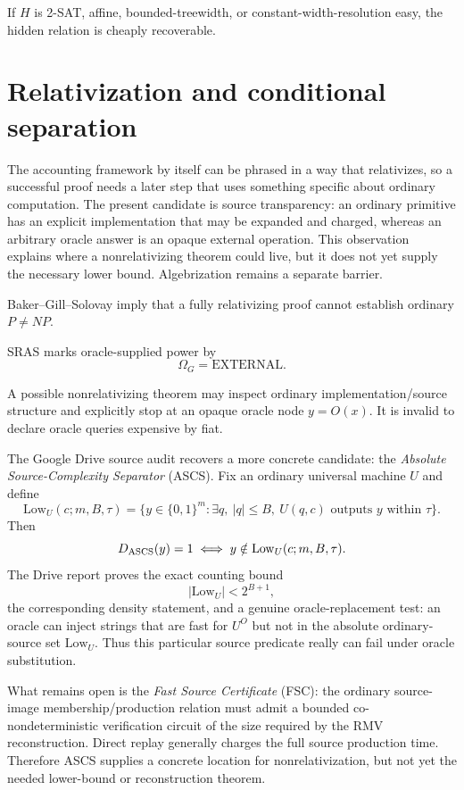 \documentclass[11pt]{article}
\theoremstyle{plain}
\theoremstyle{definition}
\theoremstyle{remark}
\begin{document}
If $H$ is 2-SAT, affine, bounded-treewidth, or constant-width-resolution easy,
the hidden relation is cheaply recoverable.

\section{Relativization and conditional separation}

The accounting framework by itself can be phrased in a way that relativizes,
so a successful proof needs a later step that uses something specific about
ordinary computation. The present candidate is source transparency: an
ordinary primitive has an explicit implementation that may be expanded and
charged, whereas an arbitrary oracle answer is an opaque external operation.
This observation explains where a nonrelativizing theorem could live, but it
does not yet supply the necessary lower bound. Algebrization remains a
separate barrier.

Baker--Gill--Solovay imply that a fully relativizing proof cannot establish
ordinary $P\ne NP$.

SRAS marks oracle-supplied power by
\[
\Omega_G=\mathrm{EXTERNAL}.
\]

A possible nonrelativizing theorem may inspect ordinary implementation/source
structure and explicitly stop at an opaque oracle node $y=O(x)$. It is invalid
to declare oracle queries expensive by fiat.

The Google Drive source audit recovers a more concrete candidate:
the \emph{Absolute Source-Complexity Separator} (ASCS).  Fix an ordinary
universal machine $U$ and define
\[
\mathrm{Low}_U(c;m,B,\tau)
=
\{y\in\{0,1\}^m:
\exists q,\ |q|\le B,\ U(q,c)\text{ outputs }y\text{ within }\tau\}.
\]
Then
\[
D_{\rm ASCS}(y)=1
\iff
y\notin\mathrm{Low}_U(c;m,B,\tau).
\]
The Drive report proves the exact counting bound
\[
|\mathrm{Low}_U|<2^{B+1},
\]
the corresponding density statement, and a genuine oracle-replacement test:
an oracle can inject strings that are fast for $U^O$ but not in the absolute
ordinary-source set $\mathrm{Low}_U$.  Thus this particular source predicate
really can fail under oracle substitution.

What remains open is the \emph{Fast Source Certificate} (FSC): the ordinary
source-image membership/production relation must admit a bounded
co-nondeterministic verification circuit of the size required by the RMV
reconstruction. Direct replay generally charges the full source production
time.  Therefore ASCS supplies a concrete location for nonrelativization, but
not yet the needed lower-bound or reconstruction theorem.
\end{document}
